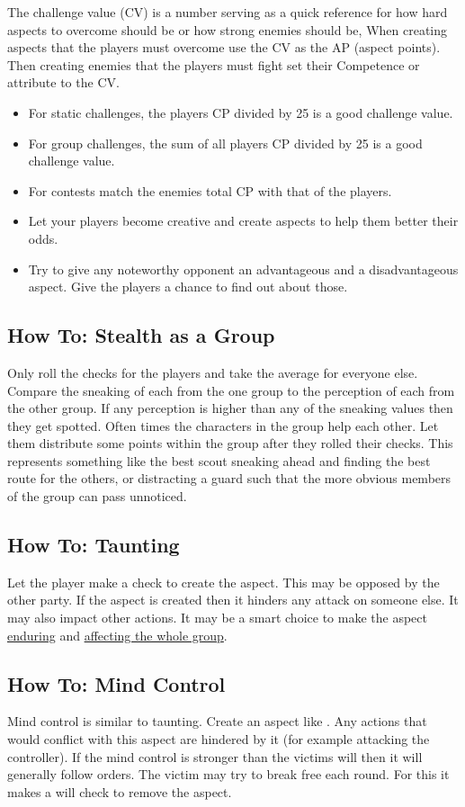 \documentclass[11pt]{article}
\begin{document}
{The challenge value (CV) is a number serving as a quick reference for how hard aspects to overcome should be or how strong enemies should be, When creating aspects that the players must overcome use the CV as the AP (aspect points). Then creating enemies that the players must fight set their Competence or attribute to the CV.
\begin{itemize}
\item For static challenges, the players CP divided by 25 is a good challenge value.
\item For group challenges, the sum of all players CP divided by 25 is a good challenge value.
\item For contests match the enemies total CP with that of the players.
\item Let your players become creative and create aspects to help them better their odds.
\item Try to give any noteworthy opponent an advantageous and a disadvantageous aspect. Give the players a chance to find out about those.
\end{itemize}
\subsection{How To: Stealth as a Group}
\label{sec:org85edd51}

Only roll the checks for the players and take the average for everyone else. Compare the sneaking of each from the one group to the perception of each from the other group. If any perception is higher than any of the sneaking values then they get spotted.
Often times the characters in the group help each other. Let them distribute some points within the group after they rolled their checks. This represents something like the best scout sneaking ahead and finding the best route for the others, or distracting a guard such that the more obvious members of the group can pass unnoticed.
\subsection{How To: Taunting}
\label{sec:orgaacd3c4}
Let the player make a check to create the  aspect. This may be opposed by the other party. If the aspect is created then it hinders any attack on someone else. It may also impact other actions. It may be a smart choice to make the  aspect \hyperref[sec:orgd4ba133]{enduring} and \hyperref[sec:orgdb6fd9e]{affecting the whole group}. 
\subsection{How To: Mind Control}
\label{sec:org2160da0}
Mind control is similar to taunting. Create an aspect like . Any actions that would conflict with this aspect are hindered by it (for example attacking the controller). If the mind control is stronger than the victims will then it will generally follow orders. The victim may try to break free each round. For this it makes a will check to remove the  aspect.

}
\end{document}
